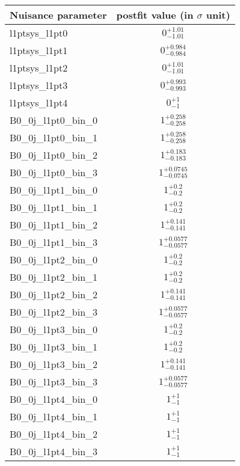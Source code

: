 
\begin{tabular}{|l|c|}
\hline
Nuisance parameter & postfit value (in $\sigma$ unit) \\\hline
l1ptsys\_l1pt0 & $0^{+1.01}_{-1.01}$ \\
l1ptsys\_l1pt1 & $0^{+0.984}_{-0.984}$ \\
l1ptsys\_l1pt2 & $0^{+1.01}_{-1.01}$ \\
l1ptsys\_l1pt3 & $0^{+0.993}_{-0.993}$ \\
l1ptsys\_l1pt4 & $0^{+1}_{-1}$ \\
B0\_0j\_l1pt0\_bin\_0 & $1^{+0.258}_{-0.258}$ \\
B0\_0j\_l1pt0\_bin\_1 & $1^{+0.258}_{-0.258}$ \\
B0\_0j\_l1pt0\_bin\_2 & $1^{+0.183}_{-0.183}$ \\
B0\_0j\_l1pt0\_bin\_3 & $1^{+0.0745}_{-0.0745}$ \\
B0\_0j\_l1pt1\_bin\_0 & $1^{+0.2}_{-0.2}$ \\
B0\_0j\_l1pt1\_bin\_1 & $1^{+0.2}_{-0.2}$ \\
B0\_0j\_l1pt1\_bin\_2 & $1^{+0.141}_{-0.141}$ \\
B0\_0j\_l1pt1\_bin\_3 & $1^{+0.0577}_{-0.0577}$ \\
B0\_0j\_l1pt2\_bin\_0 & $1^{+0.2}_{-0.2}$ \\
B0\_0j\_l1pt2\_bin\_1 & $1^{+0.2}_{-0.2}$ \\
B0\_0j\_l1pt2\_bin\_2 & $1^{+0.141}_{-0.141}$ \\
B0\_0j\_l1pt2\_bin\_3 & $1^{+0.0577}_{-0.0577}$ \\
B0\_0j\_l1pt3\_bin\_0 & $1^{+0.2}_{-0.2}$ \\
B0\_0j\_l1pt3\_bin\_1 & $1^{+0.2}_{-0.2}$ \\
B0\_0j\_l1pt3\_bin\_2 & $1^{+0.141}_{-0.141}$ \\
B0\_0j\_l1pt3\_bin\_3 & $1^{+0.0577}_{-0.0577}$ \\
B0\_0j\_l1pt4\_bin\_0 & $1^{+1}_{-1}$ \\
B0\_0j\_l1pt4\_bin\_1 & $1^{+1}_{-1}$ \\
B0\_0j\_l1pt4\_bin\_2 & $1^{+1}_{-1}$ \\
B0\_0j\_l1pt4\_bin\_3 & $1^{+1}_{-1}$ \\
\hline
\end{tabular}
